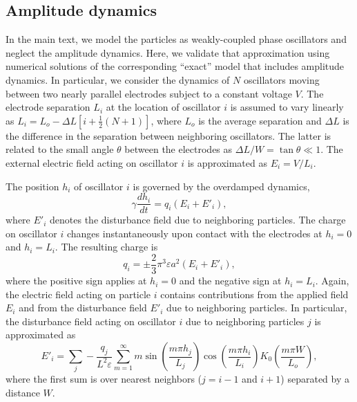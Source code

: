 \begin{appendices}
\section{Amplitude dynamics}

In the main text, we model the particles as weakly-coupled phase oscillators and neglect the amplitude dynamics.  Here, we validate that approximation using numerical solutions of the corresponding ``exact'' model that includes amplitude dynamics.  In particular, we consider the dynamics of $N$ oscillators moving between two nearly parallel electrodes subject to a constant voltage $V$.  The electrode separation $L_i$ at the location of oscillator $i$ is assumed to vary linearly as $L_i=L_o - \Delta L[i + \tfrac{1}{2}(N+1)]$, where $L_o$ is the average separation and $\Delta L$ is the difference in the separation between neighboring oscillators.  The latter is related to the small angle $\theta$ between the electrodes as  $\Delta L / W =  \tan\theta \ll1$.  The external electric field acting on oscillator $i$ is approximated as $E_i=V/L_i$.

The position $h_i$ of oscillator $i$ is governed by the overdamped dynamics,
\begin{equation}
    \gamma \frac{d h_i}{d t} = q_i (E_i + E'_i),
\end{equation}
where $E'_i$ denotes the disturbance field due to neighboring particles.  The charge on oscillator $i$ changes instantaneously upon contact with the electrodes at $h_i=0$ and $h_i=L_i$. The resulting charge is
\begin{equation}
    q_i = \pm \frac{2}{3}\pi^3 \varepsilon a^2 (E_i + E'_i),
\end{equation}
where the positive sign applies at $h_i=0$ and the negative sign at $h_i=L_i$.  Again, the electric field acting on particle $i$ contains contributions from the applied field $E_i$ and from the disturbance field $E'_i$ due to neighboring particles.  In particular, the disturbance field acting on oscillator $i$ due to neighboring particles $j$ is approximated as
\begin{equation}
    E'_i = \sum_j -\frac{q_j}{L^2 \varepsilon} \sum_{m=1}^{\infty} m \sin\left(\frac{m\pi h_j}{L_j}\right) \cos\left(\frac{m\pi h_i }{L_i}\right) K_0\left(\frac{m \pi W}{L_o}\right),
\end{equation}
where the first sum is over nearest neighbors ($j=i-1$ and $i+1$) separated by a distance $W$.


\end{appendices}
